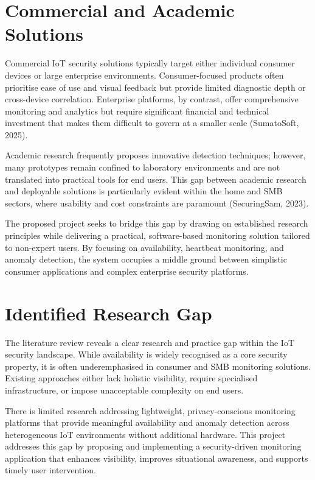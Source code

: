\section{Commercial and Academic Solutions}

Commercial IoT security solutions typically target either individual consumer devices or large enterprise environments. Consumer-focused products often prioritise ease of use and visual feedback but provide limited diagnostic depth or cross-device correlation. Enterprise platforms, by contrast, offer comprehensive monitoring and analytics but require significant financial and technical investment that makes them difficult to govern at a smaller scale (SumatoSoft, 2025).

Academic research frequently proposes innovative detection techniques; however, many prototypes remain confined to laboratory environments and are not translated into practical tools for end users. This gap between academic research and deployable solutions is particularly evident within the home and SMB sectors, where usability and cost constraints are paramount (SecuringSam, 2023).

The proposed project seeks to bridge this gap by drawing on established research principles while delivering a practical, software-based monitoring solution tailored to non-expert users. By focusing on availability, heartbeat monitoring, and anomaly detection, the system occupies a middle ground between simplistic consumer applications and complex enterprise security platforms.

\section{Identified Research Gap}

The literature review reveals a clear research and practice gap within the IoT security landscape. While availability is widely recognised as a core security property, it is often underemphasised in consumer and SMB monitoring solutions. Existing approaches either lack holistic visibility, require specialised infrastructure, or impose unacceptable complexity on end users.

There is limited research addressing lightweight, privacy-conscious monitoring platforms that provide meaningful availability and anomaly detection across heterogeneous IoT environments without additional hardware. This project addresses this gap by proposing and implementing a security-driven monitoring application that enhances visibility, improves situational awareness, and supports timely user intervention.

